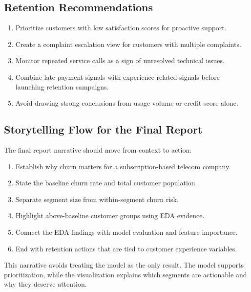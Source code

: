 \subsection{Retention Recommendations}
\begin{enumerate}
  \item Prioritize customers with low satisfaction scores for proactive support.
  \item Create a complaint escalation view for customers with multiple
  complaints.
  \item Monitor repeated service calls as a sign of unresolved technical issues.
  \item Combine late-payment signals with experience-related signals before
  launching retention campaigns.
  \item Avoid drawing strong conclusions from usage volume or credit score
  alone.
\end{enumerate}

\subsection{Storytelling Flow for the Final Report}
The final report narrative should move from context to action:
\begin{enumerate}
  \item Establish why churn matters for a subscription-based telecom company.
  \item State the baseline churn rate and total customer population.
  \item Separate segment size from within-segment churn risk.
  \item Highlight above-baseline customer groups using EDA evidence.
  \item Connect the EDA findings with model evaluation and feature importance.
  \item End with retention actions that are tied to customer experience
  variables.
\end{enumerate}

This narrative avoids treating the model as the only result. The model supports
prioritization, while the visualization explains which segments are actionable
and why they deserve attention.
